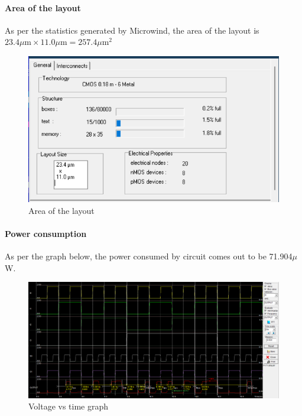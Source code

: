 \documentclass[titlepage]{article}
\begin{document}
\paragraph*{Area of the layout}
As per the statistics generated by Microwind, the area of the layout is $23.4 \mu \text{m} \times 11.0 \mu \text{m} = 257.4 \mu \text{m}^2$
\begin{figure}[ht]
    \centering
    \includegraphics{area.png}
    \caption{Area of the layout}
\end{figure}
\paragraph*{Power consumption}
As per the graph below, the power consumed by circuit comes out to be 71.904$\mu$W. \newline
\begin{figure}[ht]
    \centering
    \includegraphics[scale = 0.4]{Voltvstime_Ass1a.png}
    \caption{Voltage vs time graph}
\end{figure}
\clearpage
\end{document}
